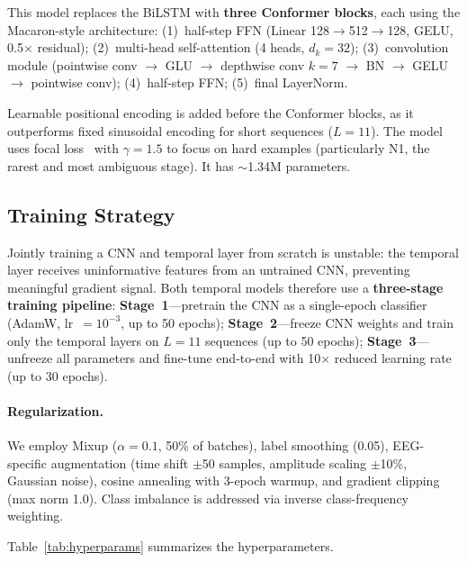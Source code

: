 \documentclass[final]{article}
\begin{document}
This model replaces the BiLSTM with \textbf{three Conformer blocks}, each using the Macaron-style architecture: (1)~half-step FFN (Linear 128$\to$512$\to$128, GELU, 0.5$\times$ residual); (2)~multi-head self-attention (4 heads, $d_k = 32$); (3)~convolution module (pointwise conv $\to$ GLU $\to$ depthwise conv $k\!=\!7$ $\to$ BN $\to$ GELU $\to$ pointwise conv); (4)~half-step FFN; (5)~final LayerNorm.

Learnable positional encoding is added before the Conformer blocks, as it outperforms fixed sinusoidal encoding for short sequences ($L = 11$). The model uses focal loss~\cite{Lin2017} with $\gamma = 1.5$ to focus on hard examples (particularly N1, the rarest and most ambiguous stage). It has $\sim$1.34M parameters.

\subsection{Training Strategy}
\label{sec:training}

Jointly training a CNN and temporal layer from scratch is unstable: the temporal layer receives uninformative features from an untrained CNN, preventing meaningful gradient signal. Both temporal models therefore use a \textbf{three-stage training pipeline}: \textbf{Stage~1}---pretrain the CNN as a single-epoch classifier (AdamW, lr~$= 10^{-3}$, up to 50 epochs); \textbf{Stage~2}---freeze CNN weights and train only the temporal layers on $L = 11$ sequences (up to 50 epochs); \textbf{Stage~3}---unfreeze all parameters and fine-tune end-to-end with 10$\times$ reduced learning rate (up to 30 epochs).

\paragraph{Regularization.} We employ Mixup ($\alpha = 0.1$, 50\% of batches), label smoothing (0.05), EEG-specific augmentation (time shift $\pm$50 samples, amplitude scaling $\pm$10\%, Gaussian noise), cosine annealing with 3-epoch warmup, and gradient clipping (max norm 1.0). Class imbalance is addressed via inverse class-frequency weighting.

Table~\ref{tab:hyperparams} summarizes the hyperparameters.
\end{document}
